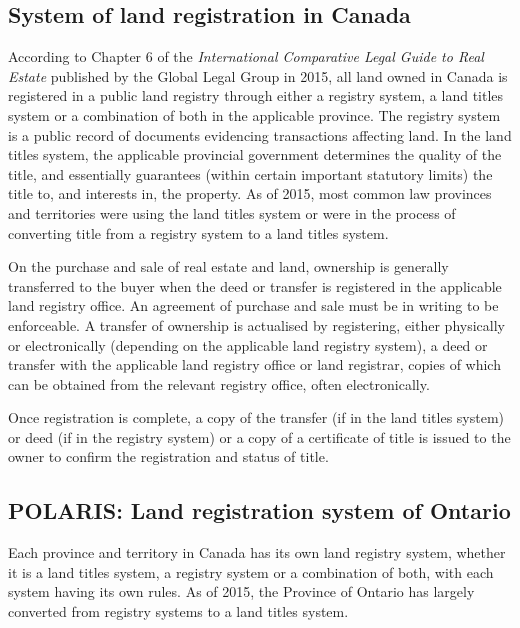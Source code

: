 \documentclass[11pt]{article}
\begin{document}
    \subsection{System of land registration in Canada} \label{subsec:land_reg_system_canada}

    According to Chapter 6 of the \textit{International Comparative Legal Guide to Real Estate} published by the Global Legal Group in 2015\cite{McKean2015}, all land owned in Canada is registered in a public land registry through either a registry system, a land titles system or a combination of both in the applicable province.
    The registry system is a public record of documents evidencing transactions affecting land.
    In the land titles system, the applicable provincial government determines the quality of the title, and essentially guarantees (within certain important statutory limits) the title to, and interests in, the property.
    As of 2015, most common law provinces and territories were using the land titles system or were in the process of converting title from a registry system to a land titles system.

    On the purchase and sale of real estate and land, ownership is generally transferred to the buyer when the deed or transfer is registered in the applicable land registry office.
    An agreement of purchase and sale must be in writing to be enforceable.
    A transfer of ownership is actualised by registering, either physically or electronically (depending on the applicable land registry system), a deed or transfer with the applicable land registry office or land registrar, copies of which can be obtained from the relevant registry office, often electronically.

    Once registration is complete, a copy of the transfer (if in the land titles system) or deed (if in the registry system) or a copy of a certificate of title is issued to the owner to confirm the registration and status of title.

    \subsection{POLARIS: Land registration system of Ontario} \label{subsec:lang_reg_operating_canada}

    Each province and territory in Canada has its own land registry system, whether it is a land titles system, a registry system or a combination of both, with each system having its own rules.
    As of 2015, the Province of Ontario has largely converted from registry systems to a land titles system.
\end{document}
